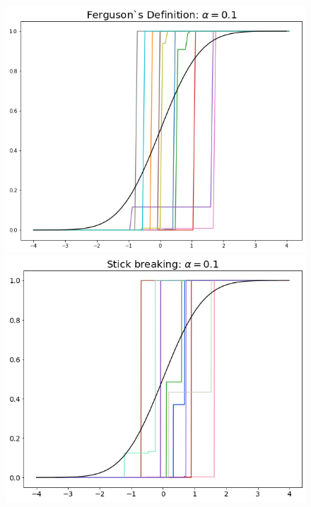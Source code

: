 \documentclass[a4paper, 10pt]{article}
\begin{document}
\begin{enumerate}
\begin{enumerate}
\begin{center}
\begin{figure}
                \includegraphics[scale = 0.3]{a1-1.png}\includegraphics[scale = 0.3]{a1-5.png}

\end{figure}
\end{center}
\end{enumerate}
\end{enumerate}
\end{document}
